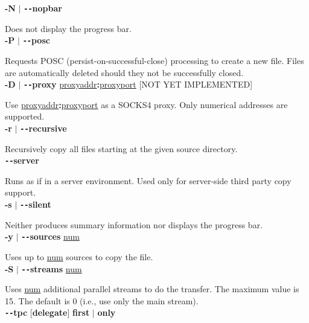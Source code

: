 \documentclass{article}
\begin{document}
		\noindent \textbf{-N} $\vert$ \textbf{\texttt{-{}-}nopbar}

		\noindent Does not display the progress bar. \\
		
		\noindent \textbf{-P} $\vert$ \textbf{\texttt{-{}-}posc}

		\noindent Requests POSC (persist-on-successful-close) processing
		to create a new file. Files are automatically deleted should they not be
		successfully closed. \\
		
		\noindent \textbf{-D} $\vert$ \textbf{\texttt{-{}-}proxy} \underline{proxyaddr}\textbf{:}\underline{proxyport} [NOT YET IMPLEMENTED]
		
		\noindent Use \underline{proxyaddr}\textbf{:}\underline{proxyport} as a SOCKS4 proxy. Only numerical addresses are supported. \\

		\noindent \textbf{-r} $\vert$ \textbf{\texttt{-{}-}recursive}

		\noindent Recursively copy all files starting at the given source directory. \\
		
		\noindent \textbf{\texttt{-{}-}server}

		\noindent Runs as if in a server environment. Used only for server-side
		third party copy support. \\
		
		\noindent\textbf{-s} $\vert$ \textbf{\texttt{-{}-}silent}

		\noindent Neither produces summary information nor displays the progress bar. \\
		
		\noindent \textbf{-y} $\vert$ \textbf{\texttt{-{}-}sources} \underline{num}

		\noindent Uses up to \underline{num} sources to copy the file. \\
		
		\noindent \textbf{-S} $\vert$ \textbf{\texttt{-{}-}streams} \underline{num}

		\noindent Uses \underline{num} additional parallel streams to do the transfer.
		The maximum value is 15. The default is 0 (i.e., use only the main stream). \\
		
		\noindent \textbf{\texttt{-{}-}tpc} [\textbf{delegate}] \textbf{first} $\vert$ \textbf{only}
\end{document}
